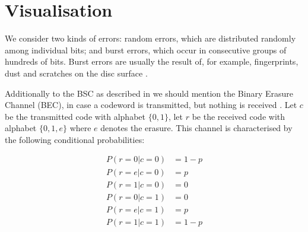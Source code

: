 \documentclass[../main.tex]{subfiles}
\begin{document}
    \chapter{Visualisation}

    We consider two kinds of errors: random errors, which are distributed randomly among individual bits; and burst errors, which occur in consecutive groups of hundreds of bits. Burst errors are usually the result of, for example, fingerprints, dust and scratches on the disc surface \autocite{wicker1999reed}.


    Additionally to the BSC as described in  we should mention the Binary Erasure Channel (BEC), in case a codeword is transmitted, but nothing is received \autocite{mackay2003information}. Let $c$ be the transmitted code with alphabet $\{0,1\}$, let $r$ be the received code with alphabet $\{0,1,e\}$ where $e$ denotes the erasure. This channel is characterised by the following conditional probabilities:

    \begin{align*}
        P(r=0 | c=0) &= 1-p\\
        P(r=e | c=0) &= p\\
        P(r=1 | c=0) &= 0\\
        P(r=0 | c=1) &= 0\\
        P(r=e | c=1) &= p\\
        P(r=1 | c=1) &= 1-p
    \end{align*}
\end{document}
